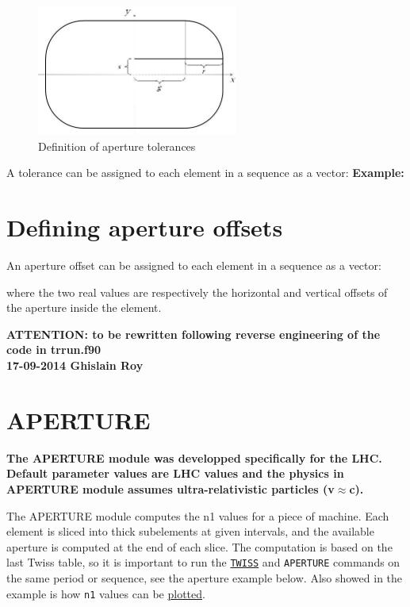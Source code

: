 \begin{figure}[htb]
  \begin{center}
    \includegraphics[width=250px]{jpg/tolerance.jpg}
    \caption{Definition of aperture tolerances}
    \label{fig:aperture_tol}
  \end{center}
\end{figure}

A tolerance can be assigned to each element in a \madx sequence as a vector: 
{\bf Example:}

\section{Defining aperture offsets}
\label{sec:aperoffset}

An aperture offset can be assigned to each element in a \madx sequence as a vector: 

where the two real values are respectively the horizontal and vertical
offsets of the aperture inside the element.

{\bf ATTENTION: to be rewritten following reverse engineering of the
  code in trrun.f90\\ 17-09-2014 Ghislain Roy}

\section{APERTURE}
\label{sec:aperture}
{\bf The APERTURE module was developped specifically for the LHC.\\ 
Default parameter values are LHC values and the physics 
in APERTURE module assumes ultra-relativistic particles (v\(\approx\)c).} 

The APERTURE module computes the n1 values for a piece of machine. 
Each element is sliced into thick subelements at given intervals, and
the available aperture is computed at the end of each slice. 
The computation is based on the last Twiss table, so it is important to
run the \hyperref[chap:twiss]{\tt TWISS} and \texttt{APERTURE} commands
on the same period or sequence, see the aperture example below. Also showed in the
example is how {\tt n1} values can be \hyperref[chap:plot]{plotted}.

